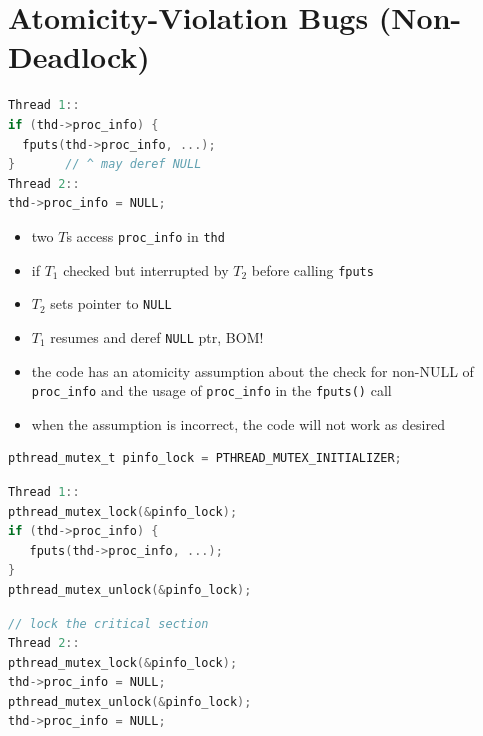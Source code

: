\section*{Atomicity-Violation Bugs (Non-Deadlock)}
\begin{minipage}{0.5\linewidth}
\begin{lstlisting}[language=c]
Thread 1::
if (thd->proc_info) {
  fputs(thd->proc_info, ...);
}       // ^ may deref NULL
Thread 2::
thd->proc_info = NULL;
\end{lstlisting}
\end{minipage}
\begin{minipage}{0.5\linewidth}
  \flushleft
  \begin{itemize}
  \item two $T$s access \texttt{proc\_info} in \texttt{thd}
  \item if $T_1$ checked but interrupted by $T_2$ before calling \texttt{fputs}
  \item $T_2$ sets pointer to \texttt{NULL}
  \item $T_1$ resumes and deref \texttt{NULL} ptr, BOM!
  \end{itemize}
\end{minipage}
\begin{itemize}
\item the code has an atomicity assumption about the check for non-NULL of \texttt{proc\_info} and the usage of \texttt{proc\_info} in the \texttt{fputs()} call
\item when the assumption is incorrect, the code will not work as desired
\end{itemize}
\begin{lstlisting}[language=c]
pthread_mutex_t pinfo_lock = PTHREAD_MUTEX_INITIALIZER;
\end{lstlisting}
\begin{minipage}{0.5\linewidth}
\begin{lstlisting}[language=c]
Thread 1::
pthread_mutex_lock(&pinfo_lock);
if (thd->proc_info) {
   fputs(thd->proc_info, ...);
}
pthread_mutex_unlock(&pinfo_lock);
\end{lstlisting}
\end{minipage}
\begin{minipage}{0.5\linewidth}
\begin{lstlisting}[language=c,xleftmargin=4pt]
// lock the critical section
Thread 2::
pthread_mutex_lock(&pinfo_lock);
thd->proc_info = NULL;
pthread_mutex_unlock(&pinfo_lock);
thd->proc_info = NULL;
\end{lstlisting}
\end{minipage}

